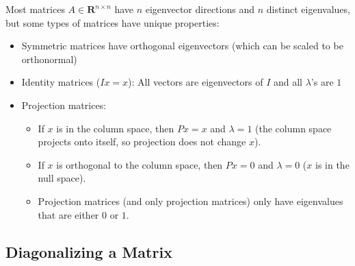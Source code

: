 \documentclass[11pt]{article}
\theoremstyle{plain}
\theoremstyle{definition}
\theoremstyle{remark}
\numberwithin{equation}{section}
\begin{document}
Most matrices $A \in \mathbf{R}^{n \times n}$ have $n$ eigenvector directions and $n$ distinct eigenvalues, but some types of matrices have unique properties:
\begin{itemize}[noitemsep] %
\item Symmetric matrices have orthogonal eigenvectors (which can be scaled to be orthonormal)
\item Identity matrices ($Ix = x$): All vectors are eigenvectors of $I$ and all $\lambda$'s are $1$
\item Projection matrices: 
\begin{itemize}[noitemsep,topsep=0pt,label=$\circ$]
\item If $x$ is in the column space, then $Px = x$ and $\lambda = 1$ (the column space projects onto itself, so projection does not change $x$).
\item If $x$ is orthogonal to the column space, then $Px = 0$ and $\lambda = 0$ ($x$ is in the null space).
\item Projection matrices (and only projection matrices) only have eigenvalues that are either $0$ or $1$.
\end{itemize}
\end{itemize}








\subsection{Diagonalizing a Matrix}
\end{document}
